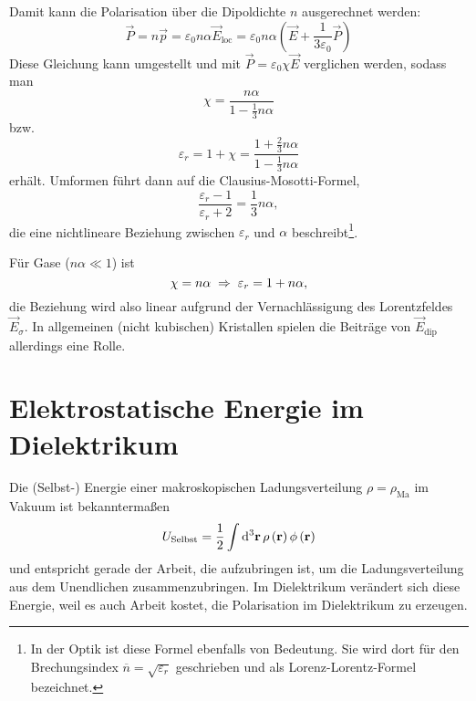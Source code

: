 Damit kann die Polarisation über die Dipoldichte $n$ ausgerechnet werden:
\begin{equation*}
	\vec {P} =n\vec {p}=\varepsilon _{0}n\alpha \vec {E}_{\mathrm{loc}}=\varepsilon _{0}n\alpha \left(\vec {E}+\frac{1}{3\varepsilon _{0}}\vec {P}\right)
\end{equation*}
Diese Gleichung kann umgestellt und mit $\vec {P}=\varepsilon _{0}\chi \vec {E}$ verglichen werden, sodass man
\begin{equation*}
	\chi =\frac{n\alpha }{1-\frac{1}{3}n\alpha }
\end{equation*}
bzw.
\begin{equation*}
	\varepsilon _{r}=1+\chi =\frac{1+\frac{2}{3}n\alpha }{1-\frac{1}{3}n\alpha }
\end{equation*}
erhält. Umformen führt dann auf die Clausius-Mosotti-Formel,
\begin{equation*}
	\frac{\varepsilon _{r}-1}{\varepsilon _{r}+2}=\frac{1}{3}n\alpha ,
\end{equation*}
die eine nichtlineare Beziehung zwischen $\varepsilon _{r}$ und $\alpha $ beschreibt\footnote{In der Optik ist diese Formel ebenfalls von Bedeutung. Sie wird dort für den Brechungsindex $\overline{n}=\sqrt{\varepsilon _{r}}$ geschrieben und als Lorenz-Lorentz-Formel bezeichnet. }.

Für Gase ($n\alpha \ll 1$) ist
\begin{equation*}
	\chi =n\alpha \implication \varepsilon _{r}=1+n\alpha ,
\end{equation*}
die Beziehung wird also linear aufgrund der Vernachlässigung des Lorentzfeldes $\vec {E}_{\sigma }$. In allgemeinen (nicht kubischen) Kristallen spielen die Beiträge von $\vec {E}_{\mathrm{dip}}$ allerdings eine Rolle.

\section{Elektrostatische Energie im Dielektrikum}

Die (Selbst-) Energie einer makroskopischen Ladungsverteilung $\rho =\rho _{\mathrm{Ma}}$ im Vakuum ist bekanntermaßen
\begin{equation*}
	U_{\text{Selbst}}=\frac{1}{2}\int \diffa[3]{\vec{r}}\rho \left(\vec {r}\right)\phi \left(\vec {r}\right)
\end{equation*}
und entspricht gerade der Arbeit, die aufzubringen ist, um die Ladungsverteilung aus dem Unendlichen zusammenzubringen. Im Dielektrikum verändert sich diese Energie, weil es auch Arbeit kostet, die Polarisation im Dielektrikum zu erzeugen.

